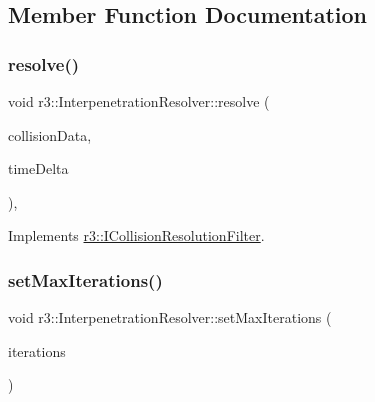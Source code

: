\subsection{Member Function Documentation}
\mbox{\label{classr3_1_1_interpenetration_resolver_a7c896a7e8e0321c9f26b3d9c616d16ee}} 
\subsubsection{\texorpdfstring{resolve()}{resolve()}}
{\footnotesize\ttfamily void r3\+::\+Interpenetration\+Resolver\+::resolve (\begin{DoxyParamCaption}\item[{\mbox{\hyperlink{classr3_1_1_collision_data}{Collision\+Data}} \&}]{collision\+Data,  }\item[{\mbox{\hyperlink{namespacer3_ab2016b3e3f743fb735afce242f0dc1eb}{real}}}]{time\+Delta }\end{DoxyParamCaption})\hspace{0.3cm}{\ttfamily [override]}, {\ttfamily [virtual]}}



Implements \mbox{\hyperlink{classr3_1_1_i_collision_resolution_filter_a87ef2579e2acaaadef4cd8f9a20005ce}{r3\+::\+I\+Collision\+Resolution\+Filter}}.

\mbox{\label{classr3_1_1_interpenetration_resolver_a8250baac4ce0ed634002ed3be4515519}} 
\subsubsection{\texorpdfstring{set\+Max\+Iterations()}{setMaxIterations()}}
{\footnotesize\ttfamily void r3\+::\+Interpenetration\+Resolver\+::set\+Max\+Iterations (\begin{DoxyParamCaption}\item[{unsigned int}]{iterations }\end{DoxyParamCaption})}

